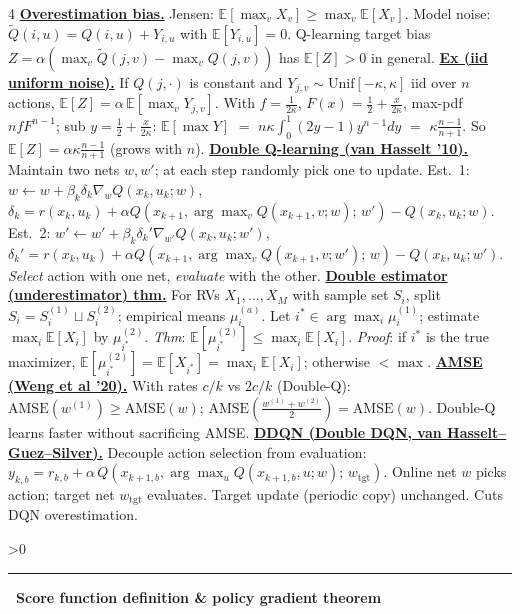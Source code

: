 \documentclass[10pt,landscape,letterpaper]{article}
\let\oldtextbf\textbf
\renewcommand{\textbf}[1]{\uline{\oldtextbf{#1}}}
\renewcommand{\section}[1]{%
  \ifnum\value{section}>0\par\vspace{1pt}\hrule\vspace{1pt}\fi
  \refstepcounter{section}\oldtextbf{\thesection\ #1}\ }
\begin{document}
\begin{multicols*}{4}
\textbf{Overestimation bias.} Jensen: \(\mathbb E[\max_v X_v]\ge\max_v\mathbb E[X_v]\).
Model noise: \(\tilde Q(i,u){=}Q(i,u){+}Y_{i,u}\) with \(\mathbb E[Y_{i,u}]{=}0\).
Q-learning target bias \(Z=\alpha(\max_v\tilde Q(j,v){-}\max_v Q(j,v))\) has \(\mathbb E[Z]>0\) in general.
\textbf{Ex (iid uniform noise).} If \(Q(j,\cdot)\) is constant and \(Y_{j,v}\sim\mathrm{Unif}[-\kappa,\kappa]\) iid over \(n\) actions, \(\mathbb E[Z]=\alpha\,\mathbb E[\max_v Y_{j,v}]\). With \(f{=}\tfrac1{2\kappa}\), \(F(x){=}\tfrac12{+}\tfrac{x}{2\kappa}\), max-pdf \(nfF^{n-1}\); sub \(y{=}\tfrac12{+}\tfrac x{2\kappa}\): \(\mathbb E[\max Y]\) \(=\) \(n\kappa\!\int_0^1\!(2y{-}1)y^{n-1}dy\) \(=\) \(\kappa\tfrac{n-1}{n+1}\). So \(\mathbb E[Z]=\alpha\kappa\tfrac{n-1}{n+1}\) (grows with \(n\)).
\textbf{Double Q-learning (van Hasselt '10).} Maintain two nets \(w,w'\); at each step randomly pick one to update.
Est.\ 1: \(w\leftarrow w+\beta_k\delta_k\nabla_w Q(x_k,u_k;w)\),
\(\delta_k=r(x_k,u_k)+\alpha Q(x_{k+1},\arg\max_v Q(x_{k+1},v;w);\,w')-Q(x_k,u_k;w)\).
Est.\ 2: \(w'\leftarrow w'+\beta_k\delta_k'\nabla_{w'}Q(x_k,u_k;w')\),
\(\delta_k'=r(x_k,u_k)+\alpha Q(x_{k+1},\arg\max_v Q(x_{k+1},v;w');\,w)-Q(x_k,u_k;w')\).
\emph{Select} action with one net, \emph{evaluate} with the other.
\textbf{Double estimator (underestimator) thm.} For RVs \(X_1,\ldots,X_M\) with sample set \(S_i\), split \(S_i=S_i^{(1)}\sqcup S_i^{(2)}\); empirical means \(\mu_i^{(a)}\).
Let \(i^*\in\arg\max_i\mu_i^{(1)}\); estimate \(\max_i\mathbb E[X_i]\) by \(\mu_{i^*}^{(2)}\).
\emph{Thm}: \(\mathbb E[\mu_{i^*}^{(2)}]\le\max_i\mathbb E[X_i]\).
\emph{Proof}: if \(i^*\) is the true maximizer, \(\mathbb E[\mu_{i^*}^{(2)}]=\mathbb E[X_{i^*}]=\max_i\mathbb E[X_i]\); otherwise \(<\max\).
\textbf{AMSE (Weng et al '20).} With rates \(c/k\) vs \(2c/k\) (Double-Q):
\(\mathrm{AMSE}(w^{(1)})\ge\mathrm{AMSE}(w)\); \(\mathrm{AMSE}(\tfrac{w^{(1)}+w^{(2)}}{2})=\mathrm{AMSE}(w)\).
Double-Q learns faster without sacrificing AMSE.
\textbf{DDQN (Double DQN, van Hasselt–Guez–Silver).} Decouple action selection from evaluation:
\(y_{k,b}=r_{k,b}+\alpha\,Q(x_{k+1,b},\arg\max_u Q(x_{k+1,b},u;w);\,w_{\text{tgt}})\).
Online net \(w\) picks action; target net \(w_{\text{tgt}}\) evaluates. Target update (periodic copy) unchanged. Cuts DQN overestimation.

\section{Score function definition \& policy gradient theorem}


\end{multicols*}
\end{document}
